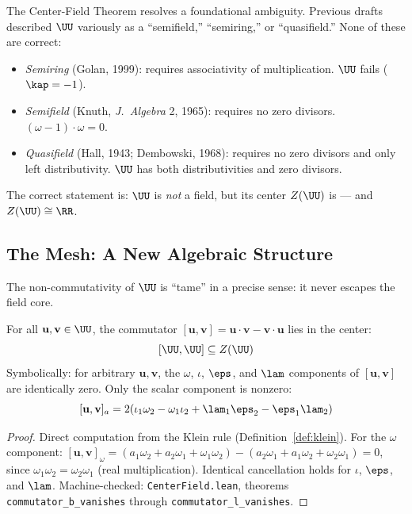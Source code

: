 \begin{remark}
The Center-Field Theorem resolves a foundational ambiguity. Previous drafts described $\UU$ variously as a ``semifield,'' ``semiring,'' or ``quasifield.'' None of these are correct:
\begin{itemize}[noitemsep]
\item \emph{Semiring} (Golan, 1999): requires associativity of multiplication. $\UU$ fails ($\kap = -1$).
\item \emph{Semifield} (Knuth, \emph{J.~Algebra} 2, 1965): requires no zero divisors. $(\omega - 1) \cdot \omega = 0$.
\item \emph{Quasifield} (Hall, 1943; Dembowski, 1968): requires no zero divisors and only left distributivity. $\UU$ has both distributivities and zero divisors.
\end{itemize}
The correct statement is: $\UU$ is \emph{not} a field, but its center $Z(\UU)$ is --- and $Z(\UU) \cong \RR$.
\end{remark}


\subsection{The Mesh: A New Algebraic Structure}\label{sec:mesh}

The non-commutativity of $\UU$ is ``tame'' in a precise sense: it never escapes the field core.

\begin{theorem}{\label{thm:mesh-condition}}
For all $\mathbf{u}, \mathbf{v} \in \UU$, the commutator $[\mathbf{u}, \mathbf{v}] = \mathbf{u} \cdot \mathbf{v} - \mathbf{v} \cdot \mathbf{u}$ lies in the center:
$$[\UU, \UU] \subseteq Z(\UU)$$
Symbolically: for arbitrary $\mathbf{u}, \mathbf{v}$, the $\omega$, $\iota$, $\eps$, and $\lam$ components of $[\mathbf{u}, \mathbf{v}]$ are identically zero. Only the scalar component is nonzero:
$$[\mathbf{u}, \mathbf{v}]_a = 2(\iota_1 \omega_2 - \omega_1 \iota_2 + \lam_1 \eps_2 - \eps_1 \lam_2)$$
\end{theorem}

\begin{proof}
Direct computation from the Klein rule (Definition~\ref{def:klein}). For the $\omega$ component:
$[\mathbf{u}, \mathbf{v}]_\omega = (a_1 \omega_2 + a_2 \omega_1 + \omega_1 \omega_2) - (a_2 \omega_1 + a_1 \omega_2 + \omega_2 \omega_1) = 0$,
since $\omega_1 \omega_2 = \omega_2 \omega_1$ (real multiplication). Identical cancellation holds for $\iota$, $\eps$, and $\lam$. Machine-checked: \texttt{CenterField.lean}, theorems \texttt{commutator\_b\_vanishes} through \texttt{commutator\_l\_vanishes}. \qedhere
\end{proof}

